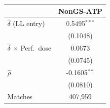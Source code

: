 \begin{tabular}{lc}
\toprule
 & NonGS-ATP \\
\midrule
$\hat{\delta}$ (LL entry) & 0.5495$^{***}$ \\
 & (0.1048) \\
$\hat{\delta}$ $\times$ Perf.\ dose & 0.0673 \\
 & (0.0745) \\
$\hat{\rho}$ & -0.1605$^{**}$ \\
 & (0.0810) \\
\midrule
Matches & 407,959 \\
\bottomrule
\end{tabular}
